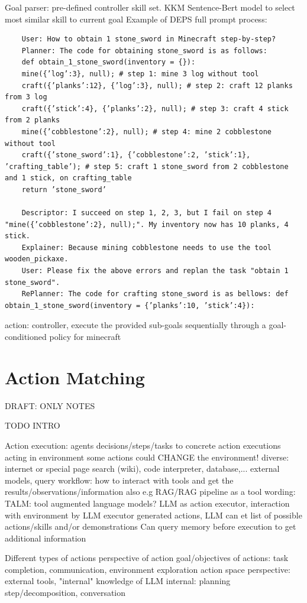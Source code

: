 \documentclass{article}
\begin{document}
Goal parser: pre-defined controller skill set. KKM Sentence-Bert model to select most similar skill to current goal
Example of DEPS full prompt process:
\begin{verbatim}
	User: How to obtain 1 stone_sword in Minecraft step-by-step? 
	Planner: The code for obtaining stone_sword is as follows: 
	def obtain_1_stone_sword(inventory = {}): 
	mine({’log’:3}, null); # step 1: mine 3 log without tool 
	craft({’planks’:12}, {’log’:3}, null); # step 2: craft 12 planks from 3 log 
	craft({’stick’:4}, {’planks’:2}, null); # step 3: craft 4 stick from 2 planks 
	mine({’cobblestone’:2}, null); # step 4: mine 2 cobblestone without tool 
	craft({’stone_sword’:1}, {’cobblestone’:2, ’stick’:1}, ’crafting_table’); # step 5: craft 1 stone_sword from 2 cobblestone and 1 stick, on crafting_table 
	return ’stone_sword’ 
	
	Descriptor: I succeed on step 1, 2, 3, but I fail on step 4 "mine({’cobblestone’:2}, null);". My inventory now has 10 planks, 4 stick. 
	Explainer: Because mining cobblestone needs to use the tool wooden_pickaxe. 
	User: Please fix the above errors and replan the task "obtain 1 stone_sword". 
	RePlanner: The code for crafting stone_sword is as bellows: def obtain_1_stone_sword(inventory = {’planks’:10, ’stick’:4}):
\end{verbatim}
action: controller, execute the provided sub-goals sequentially through a goal-conditioned policy for minecraft



\FloatBarrier
\section{Action Matching}
DRAFT: ONLY NOTES

TODO INTRO

Action execution: 
agents decisions/steps/tasks to concrete action executions 
acting in environment 
some actions could CHANGE the environment! 
diverse: internet or special page search (wiki), code interpreter, database,... external models, query
workflow: how to interact with tools and get the results/observations/information
also e.g RAG/RAG pipeline as a tool
wording: TALM: tool augmented language models?
LLM as action executor, interaction with environment by LLM executor generated actions, LLM can et list of possible actions/skills and/or demonstrations 
Can query memory before execution to get additional information

Different types of actions \cite{wang_survey_2023} perspective of action goal/objectives of actions:
task completion, communication, environment exploration
action space perspective: external tools, "internal" knowledge of LLM
internal: planning step/decomposition, conversation
\end{document}
